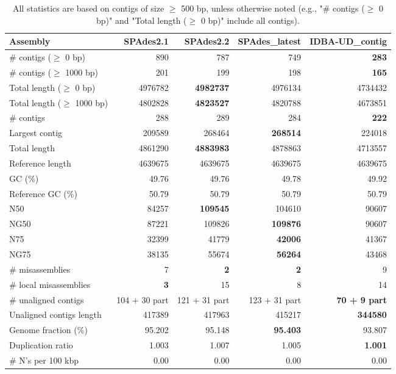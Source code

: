 \documentclass[12pt,a4paper]{article}
\begin{document}
\begin{table}[ht]
\begin{center}
\caption{All statistics are based on contigs of size $\geq$ 500 bp, unless otherwise noted (e.g., "\# contigs ($\geq$ 0 bp)" and "Total length ($\geq$ 0 bp)" include all contigs).}
\begin{tabular}{|l*{4}{|r}|}
\hline
Assembly & SPAdes2.1 & SPAdes2.2 & SPAdes\_latest & IDBA-UD\_contig \\ \hline
\# contigs ($\geq$ 0 bp) & 890 & 787 & 749 & {\bf 283} \\ \hline
\# contigs ($\geq$ 1000 bp) & 201 & 199 & 198 & {\bf 165} \\ \hline
Total length ($\geq$ 0 bp) & 4976782 & {\bf 4982737} & 4976134 & 4734432 \\ \hline
Total length ($\geq$ 1000 bp) & 4802828 & {\bf 4823527} & 4820788 & 4673851 \\ \hline
\# contigs & 288 & 289 & 284 & {\bf 222} \\ \hline
Largest contig & 209589 & 268464 & {\bf 268514} & 224018 \\ \hline
Total length & 4861290 & {\bf 4883983} & 4878863 & 4713557 \\ \hline
Reference length & 4639675 & 4639675 & 4639675 & 4639675 \\ \hline
GC (\%) & 49.76 & 49.76 & 49.78 & 49.92 \\ \hline
Reference GC (\%) & 50.79 & 50.79 & 50.79 & 50.79 \\ \hline
N50 & 84257 & {\bf 109545} & 104610 & 90607 \\ \hline
NG50 & 87221 & 109826 & {\bf 109876} & 90607 \\ \hline
N75 & 32399 & 41779 & {\bf 42006} & 41367 \\ \hline
NG75 & 38135 & 55674 & {\bf 56264} & 43468 \\ \hline
\# misassemblies & 7 & {\bf 2} & {\bf 2} & 9 \\ \hline
\# local misassemblies & {\bf 3} & 15 & 8 & 14 \\ \hline
\# unaligned contigs & 104 + 30 part & 121 + 31 part & 123 + 31 part & {\bf 70 + 9 part} \\ \hline
Unaligned contigs length & 417389 & 417963 & 415217 & {\bf 344580} \\ \hline
Genome fraction (\%) & 95.202 & 95.148 & {\bf 95.403} & 93.807 \\ \hline
Duplication ratio & 1.003 & 1.007 & 1.005 & {\bf 1.001} \\ \hline
\# N's per 100 kbp & 0.00 & 0.00 & 0.00 & 0.00 \\ \hline

\end{tabular}
\end{center}
\end{table}
\end{document}
